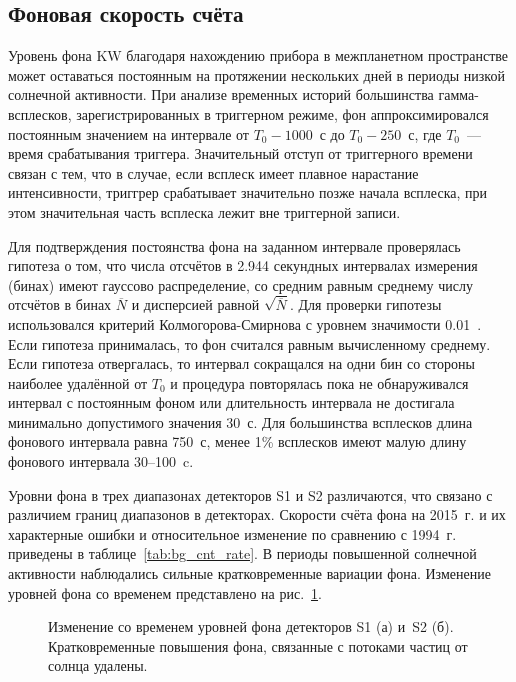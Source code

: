 \subsection{Фоновая скорость счёта}\label{sec:Bg_rate}
Уровень фона KW благодаря нахождению прибора в межпланетном пространстве 
может оставаться постоянным на протяжении нескольких дней в периоды низкой 
солнечной активности. При анализе временных историй большинства гамма-всплесков, 
зарегистрированных в триггерном режиме, фон аппроксимировался 
постоянным значением на интервале от $T_0 - 1000$~с до $T_0 - 250$~с, 
где $T_0$~--- время срабатывания триггера. Значительный отступ от триггерного 
времени связан с тем, что 
в случае, если всплеск имеет плавное нарастание интенсивности, 
триггрер срабатывает значительно позже начала всплеска, при этом
значительная часть всплеска лежит вне триггерной записи. 

Для подтверждения постоянства фона на заданном интервале проверялась гипотеза о том, 
что числа отсчётов в 2.944 секундных интервалах измерения (бинах) 
имеют гауссово распределение, со средним равным среднему числу отсчётов 
в бинах $\overline{N}$ и дисперсией равной $\sqrt{\overline{N}}$. 
Для проверки гипотезы использовался критерий Колмогорова-Смирнова с уровнем значимости 0.01~\citep{Press_1992NumRec}. 
Если гипотеза принималась, то фон считался равным вычисленному среднему. 
Если гипотеза отвергалась, то интервал сокращался на одни бин со стороны наиболее 
удалённой от $T_0$ и процедура повторялась пока не обнаруживался интервал с постоянным фоном 
или длительность интервала не достигала минимально допустимого значения 30~с. 
Для большинства всплесков длина фонового интервала равна 750~с, менее 1\% 
всплесков имеют малую длину фонового интервала 30--100~c.

Уровни фона в трех диапазонах детекторов S1 и S2 различаются, 
что связано с различием границ диапазонов в детекторах. Скорости счёта фона 
на 2015~г. и их характерные ошибки и относительное изменение по сравнению с 1994~г.
приведены в таблице~\ref{tab:bg_cnt_rate}.
В периоды повышенной солнечной активности наблюдались сильные кратковременные вариации фона. 
Изменение уровней фона со временем представлено на рис.~\ref{img:KW_bg_drift}.

 

\begin{figure}[h]
  \begin{minipage}[h]{0.5\textwidth}
  \end{minipage}
  \hfill
  \begin{minipage}[h]{0.5\textwidth}
  \end{minipage}
  \caption[Изменение со временем уровней фона детекторов S1 и~S2]
  {Изменение со временем уровней фона детекторов S1 (а) и~S2 (б). 
  Кратковременные повышения фона, связанные с потоками частиц от солнца удалены.}
  \label{img:KW_bg_drift}  
\end{figure}

